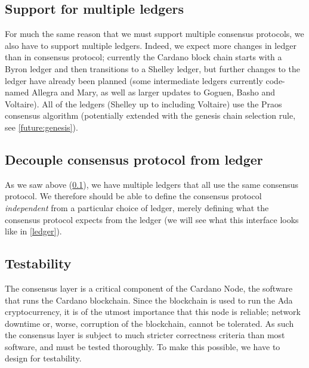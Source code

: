 \subsection{Support for multiple ledgers}
\label{multiple-ledgers}

For much the same reason that we must support multiple consensus protocols, we
also have to support multiple ledgers. Indeed, we expect more changes in ledger
than in consensus protocol; currently the Cardano block chain starts with a
Byron ledger and then transitions to a Shelley ledger, but further changes to
the ledger have already been planned (some intermediate ledgers currently
code-named Allegra and Mary, as well as larger updates to Goguen, Basho and
Voltaire). All of the ledgers (Shelley up to including Voltaire)
use the Praos consensus algorithm (potentially extended with the genesis chain
selection rule, see \cref{future:genesis}).

\subsection{Decouple consensus protocol from ledger}
\label{decouple-consensus-ledger}

As we saw above (\cref{multiple-ledgers}), we have multiple ledgers that all
use the same consensus protocol. We therefore should be able to define the
consensus protocol \emph{independent} from a particular choice of ledger,
merely defining what the consensus protocol expects from the ledger
(we will see what this interface looks like in \cref{ledger}).

\subsection{Testability}
\label{testability}

The consensus layer is a critical component of the Cardano Node, the software
that runs the Cardano blockchain. Since the blockchain is used to run the Ada
cryptocurrency, it is of the utmost importance that this node is reliable;
network downtime or, worse, corruption of the blockchain, cannot be tolerated.
As such the consensus layer is subject to much stricter correctness criteria
than most software, and must be tested thoroughly. To make this possible, we
have to design for testability.


